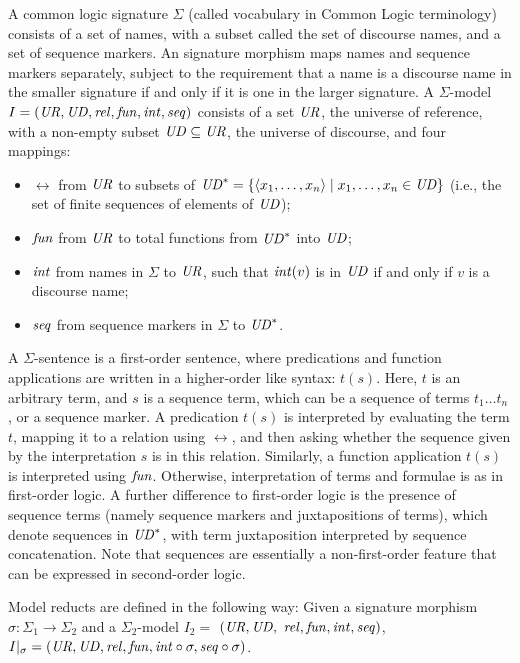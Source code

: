 \documentclass[10pt, a4paper]{isov2}
\begin{document}
\begin{definition}\label{CommonLogic}   
A common logic signature
$\Sigma$ (called vocabulary in Common Logic terminology) consists of a
set of names, with a subset called the set of discourse names, and a
set of sequence markers. An signature morphism maps
names and sequence markers separately, subject to the requirement
 that a name is a discourse
name in the smaller signature if and only if it is one in the larger signature.  A $\Sigma$-model $I=(\mathit{UR},\mathit{UD},\mathit{rel},\mathit{fun},\mathit{int},\mathit{seq})$ consists of a set $\mathit{UR}$,
the universe of reference, with a non-empty subset $\mathit{UD}\subseteq \mathit{UR}$,
the universe of discourse, and four mappings:
  \begin{itemize}
   \item $\rel$ from $\mathit{UR}$ to subsets of $\mathit{UD}^* = \{ \langle x_1,\ldots,x_n\rangle \mid
x_1,\ldots,x_n \in \mathit{UD}\}$ (i.e., the set of finite sequences of
elements of $\mathit{UD}$);
   \item $\mathit{fun}$ from $\mathit{UR}$ to total functions from $\mathit{UD}^*$ into $\mathit{UD}$;
   \item $\mathit{int}$ from names in $\Sigma$ to $\mathit{UR}$, such that
$\mathit{int}(v)$ is in $\mathit{UD}$ if and only if $v$ is a discourse name;
   \item $\mathit{seq}$ from sequence markers in $\Sigma$ to $\mathit{UD}^*$.
  \end{itemize}  A $\Sigma$-sentence is a first-order
sentence, where predications and function applications are written
in a higher-order like syntax: $t(s)$.
Here, $t$ is an arbitrary term, and $s$ is a sequence term, which can
be a sequence of terms $t_1\ldots t_n$, or a sequence marker.
A predication $t(s)$ is interpreted by evaluating the term $t$,
mapping it to a relation using $\rel$, and then asking whether the sequence
given by the interpretation $s$ is in this relation.  
Similarly, a function application $t(s)$ is interpreted using $\mathit{fun}$.
Otherwise, interpretation of terms and formulae is as in
first-order logic. 
A further
difference to first-order logic
is the presence of sequence terms (namely sequence markers and
juxtapositions of terms), which denote sequences in $\mathit{UD}^*$, with term
juxtaposition interpreted by sequence concatenation.
Note that sequences are essentially a non-first-order feature that
can be expressed in second-order logic.

Model reducts are defined in the following way: 
Given a signature morphism $\sigma:\Sigma_1\to\Sigma_2$ and a $\Sigma_2$-model
$I_2 =$ $(\mathit{UR},\mathit{UD},$ $\mathit{rel},\mathit{fun},\mathit{int},\mathit{seq})$, $I|_{\sigma}=(\mathit{UR},\mathit{UD},\mathit{rel},\mathit{fun},\mathit{int}\circ\sigma,\mathit{seq}\circ\sigma)$. 


\end{definition}
\end{document}
